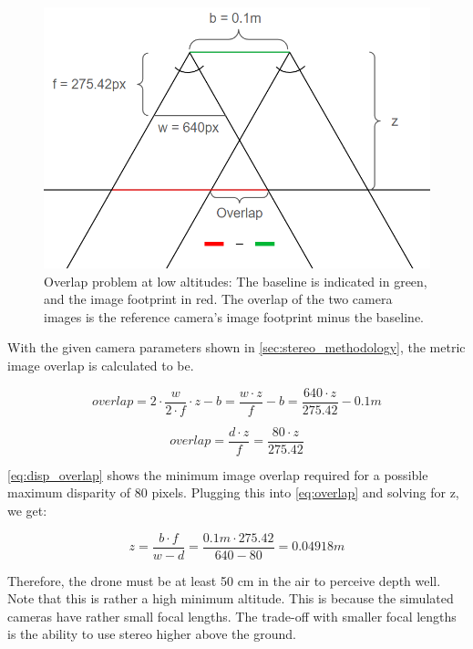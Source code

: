\clearpage %

\begin{figure}[h]
    \centering
    \includegraphics[scale=0.5]{images/stereo_camera_depth/overlap.png}
    \caption{Overlap problem at low altitudes: The baseline is indicated in green, and the image footprint in red. The overlap of the two camera images is the reference camera's image footprint minus the baseline.}
    \label{fig:overlap}
\end{figure}

With the given camera parameters shown in \cref{sec:stereo_methodology}, the metric image overlap is calculated to be.

\begin{equation}
    overlap = 2 \cdot \frac{w}{2\cdot f} \cdot z - b = \frac{w\cdot z}{f} - b = \frac{640\cdot z}{275.42} - 0.1 m
    \label{eq:overlap}
\end{equation}

\begin{equation}
    overlap = \frac{d \cdot z}{f} = \frac{80 \cdot z}{275.42}
    \label{eq:disp_overlap}
\end{equation}

\cref{eq:disp_overlap} shows the minimum image overlap required for a possible maximum disparity of 80 pixels. Plugging this into \cref{eq:overlap} and solving for z, we get:

\begin{equation}
    z = \frac{b \cdot f}{w - d} = \frac{0.1 m \cdot 275.42}{640 - 80} = 0.04918 m
\end{equation}

Therefore, the drone must be at least 50 cm in the air to perceive depth well. Note that this is rather a high minimum altitude. This is because the simulated cameras have rather small focal lengths. The trade-off with smaller focal lengths is the ability to use stereo higher above the ground. 

